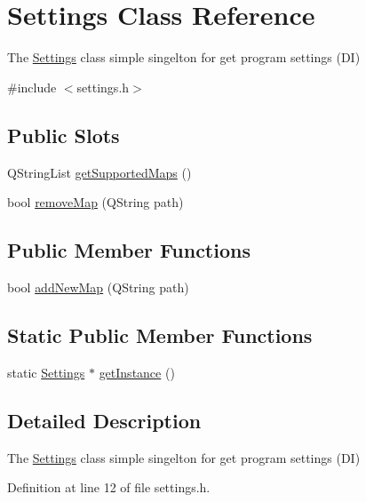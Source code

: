 \hypertarget{class_settings}{}\section{Settings Class Reference}
\label{class_settings}


The \hyperlink{class_settings}{Settings} class simple singelton for get program settings (DI)  




{\ttfamily \#include $<$settings.\+h$>$}

\subsection*{Public Slots}
\begin{DoxyCompactItemize}
\item 
Q\+String\+List \hyperlink{class_settings_af7963b6de1f353af5b721422f91f8096}{get\+Supported\+Maps} ()
\item 
bool \hyperlink{class_settings_a62312388f51c4c1a185a933128ec2e50}{remove\+Map} (Q\+String path)
\end{DoxyCompactItemize}
\subsection*{Public Member Functions}
\begin{DoxyCompactItemize}
\item 
bool \hyperlink{class_settings_a5dcb3f0c7e2e145a4553edd78cf5fa5c}{add\+New\+Map} (Q\+String path)
\end{DoxyCompactItemize}
\subsection*{Static Public Member Functions}
\begin{DoxyCompactItemize}
\item 
static \hyperlink{class_settings}{Settings} $\ast$ \hyperlink{class_settings_a5134bac1c68824ef48651c8469cf8722}{get\+Instance} ()
\end{DoxyCompactItemize}


\subsection{Detailed Description}
The \hyperlink{class_settings}{Settings} class simple singelton for get program settings (DI) 

Definition at line 12 of file settings.\+h.



